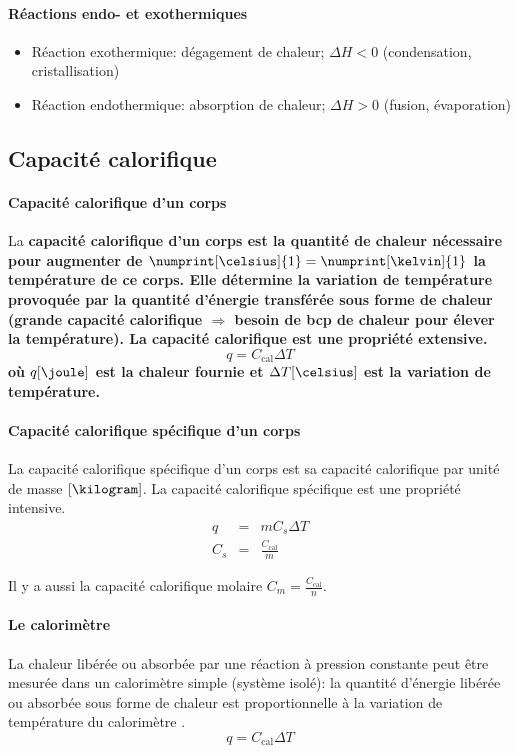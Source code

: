 \documentclass[11pt,a4paper,french]{article}
\renewcommand{\textbf}[1]{\begingroup\bfseries\mathversion{bold}#1\endgroup}
\newcommand\ccal{C_\mathrm{cal}}
\begin{document}
\paragraph{Réactions endo- et exothermiques}
\begin{itemize}
\item Réaction exothermique: dégagement de chaleur; $\Delta H<0$ (condensation, cristallisation)
\item Réaction endothermique: absorption de chaleur; $\Delta H>0$ (fusion, évaporation)
\end{itemize}

\subsection{Capacité calorifique}
\paragraph{Capacité calorifique d'un corps} \label{sec:C_cal}
La \textbf{capacité calorifique} d'un corps est la quantité de chaleur nécessaire pour augmenter de $\numprint[\celsius]{1} = \numprint[\kelvin]{1}$ la température de ce corps.
Elle détermine la variation de température provoquée par la quantité d'énergie transférée sous forme de chaleur (grande capacité calorifique $\Rightarrow$ besoin de bcp de chaleur pour élever la température).
La capacité calorifique est une propriété extensive.
\[ q = \ccal \Delta T \]
où $q[\joule]$ est la chaleur fournie et $\Delta T[\celsius]$ est la variation de température.

\paragraph{Capacité calorifique spécifique d'un corps} \label{sec:C_s}
La capacité calorifique spécifique d'un corps est sa capacité calorifique par unité de masse $[\kilogram]$.
La capacité calorifique spécifique est une propriété intensive.
\begin{eqnarray*}
	q &=& m C_s \Delta T\\
	C_s &=& \frac{\ccal}{m}
\end{eqnarray*}

Il y a aussi la capacité calorifique molaire $C_m = \frac{\ccal}{n}$.


\paragraph{Le calorimètre}
La chaleur libérée ou absorbée par une réaction à pression constante peut être mesurée dans un calorimètre simple (système isolé): la quantité d'énergie libérée ou absorbée sous forme de chaleur est proportionnelle à la variation de température du calorimètre \cite[pp.~16,17]{legras}.
$$q=\ccal \Delta T$$
\end{document}
